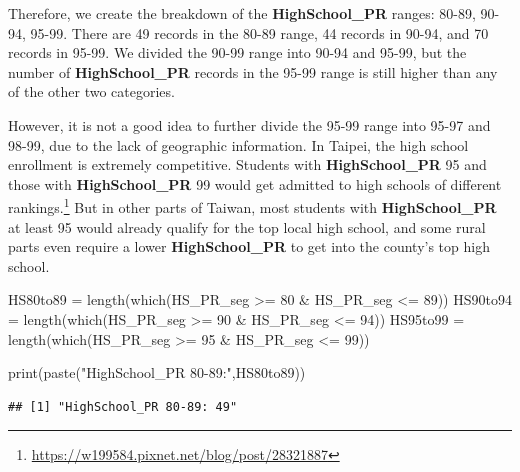 \documentclass[
]{article}
\newenvironment{Shaded}{\begin{snugshade}}{\end{snugshade}}
\newcommand{\DecValTok}[1]{\textcolor[rgb]{0.00,0.00,0.81}{#1}}
\newcommand{\FunctionTok}[1]{\textcolor[rgb]{0.00,0.00,0.00}{#1}}
\newcommand{\NormalTok}[1]{#1}
\newcommand{\OtherTok}[1]{\textcolor[rgb]{0.56,0.35,0.01}{#1}}
\newcommand{\SpecialCharTok}[1]{\textcolor[rgb]{0.00,0.00,0.00}{#1}}
\newcommand{\StringTok}[1]{\textcolor[rgb]{0.31,0.60,0.02}{#1}}
\begin{document}
Therefore, we create the breakdown of the \textbf{HighSchool\_PR}
ranges: 80-89, 90-94, 95-99. There are 49 records in the 80-89 range, 44
records in 90-94, and 70 records in 95-99. We divided the 90-99 range
into 90-94 and 95-99, but the number of \textbf{HighSchool\_PR} records
in the 95-99 range is still higher than any of the other two categories.

However, it is not a good idea to further divide the 95-99 range into
95-97 and 98-99, due to the lack of geographic information. In Taipei,
the high school enrollment is extremely competitive. Students with
\textbf{HighSchool\_PR} 95 and those with \textbf{HighSchool\_PR} 99
would get admitted to high schools of different rankings.\footnote{\url{https://w199584.pixnet.net/blog/post/28321887}}
But in other parts of Taiwan, most students with \textbf{HighSchool\_PR}
at least 95 would already qualify for the top local high school, and
some rural parts even require a lower \textbf{HighSchool\_PR} to get
into the county's top high school.

\begin{Shaded}
\begin{Highlighting}[]
\NormalTok{HS80to89 }\OtherTok{=} \FunctionTok{length}\NormalTok{(}\FunctionTok{which}\NormalTok{(HS\_PR\_seg }\SpecialCharTok{\textgreater{}=} \DecValTok{80} \SpecialCharTok{\&}\NormalTok{ HS\_PR\_seg }\SpecialCharTok{\textless{}=} \DecValTok{89}\NormalTok{))}
\NormalTok{HS90to94 }\OtherTok{=} \FunctionTok{length}\NormalTok{(}\FunctionTok{which}\NormalTok{(HS\_PR\_seg }\SpecialCharTok{\textgreater{}=} \DecValTok{90} \SpecialCharTok{\&}\NormalTok{ HS\_PR\_seg }\SpecialCharTok{\textless{}=} \DecValTok{94}\NormalTok{))}
\NormalTok{HS95to99 }\OtherTok{=} \FunctionTok{length}\NormalTok{(}\FunctionTok{which}\NormalTok{(HS\_PR\_seg }\SpecialCharTok{\textgreater{}=} \DecValTok{95} \SpecialCharTok{\&}\NormalTok{ HS\_PR\_seg }\SpecialCharTok{\textless{}=} \DecValTok{99}\NormalTok{))}
\end{Highlighting}
\end{Shaded}

\begin{Shaded}
\begin{Highlighting}[]
\FunctionTok{print}\NormalTok{(}\FunctionTok{paste}\NormalTok{(}\StringTok{"HighSchool\_PR 80{-}89:"}\NormalTok{,HS80to89))}
\end{Highlighting}
\end{Shaded}

\begin{verbatim}
## [1] "HighSchool_PR 80-89: 49"
\end{verbatim}
\end{document}
